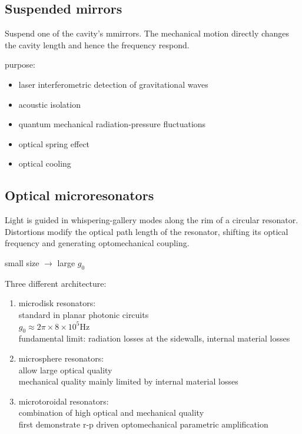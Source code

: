 \documentclass[8pt,a4paper,twocolumn]{article} %
\numberwithin{equation}{section} %
\begin{document}
		\subsection{Suspended mirrors} %
		\label{sub:suspended_mirrors}
			Suspend one of the cavity's mmirrors. The mechanical motion directly changes the cavity length and hence the frequency respond.

			purpose:
			\begin{itemize}
				\item laser interferometric detection of gravitational waves
				\item acoustic isolation
				\item quantum mechanical radiation-pressure fluctuations
				\item optical spring effect
				\item optical cooling
			\end{itemize}

		\subsection{Optical microresonators} %
		\label{sub:optical_microresonators}
			Light is guided in whispering-gallery modes along the rim of a circular resonator. Distortions modify the optical path length of the resonator, shifting its optical frequency and generating optomechanical coupling.

			small size $ \rightarrow $ large $g_0$

			Three different architecture:
			\begin{enumerate}
				\item microdisk resonators: \\
				standard in planar photonic circuits\\
				$ g_0 \approx 2 \pi \times 8 \times 10^{5} $Hz\\
				fundamental limit: radiation losses at the sidewalls, internal material losses
				\item microsphere resonators:\\
				allow large optical quality\\
				mechanical quality mainly limited by internal material losses
				\item microtoroidal resonators:\\
				combination of high optical and mechanical quality\\
				first demonstrate r-p driven optomechanical parametric amplification
			\end{enumerate}
\end{document}
